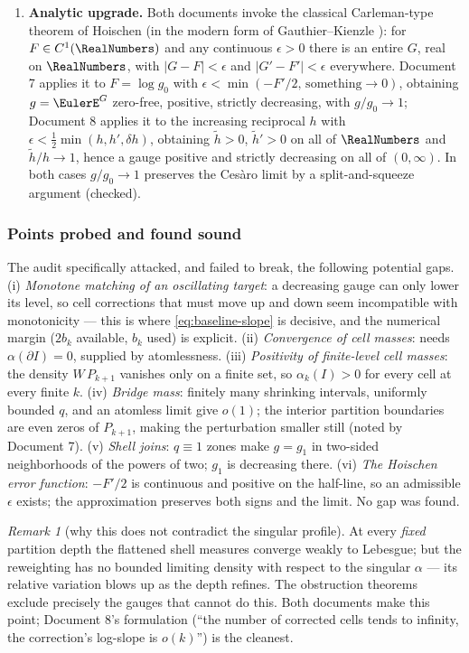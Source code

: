 \documentclass[11pt,oneside]{article}
\theoremstyle{definition}
\theoremstyle{remark}
\newtheorem{remark}[theorem]{Remark}
\begin{document}
\begin{enumerate}
\item \textbf{Analytic upgrade.}  Both documents invoke the classical
Carleman-type theorem of Hoischen (in the modern form of
Gauthier--Kienzle \cite{gauthier-kienzle,hoischen}): for
$F\in C^1(\RealNumbers)$ and any continuous $\epsilon>0$ there is an entire $G$,
real on $\RealNumbers$, with $|G-F|<\epsilon$ and $|G'-F'|<\epsilon$ everywhere.
Document 7 applies it to $F=\log g_0$ with
$\epsilon<\min(-F'/2,\,\text{something}\to0)$, obtaining
$g=\EulerE^G$ zero-free, positive, strictly decreasing, with
$g/g_0\to1$; Document 8 applies it to the increasing reciprocal $h$
with $\epsilon<\frac12\min(h,h',\delta h)$, obtaining
$\widetilde h>0$, $\widetilde h'>0$ on all of $\RealNumbers$ and
$\widetilde h/h\to1$, hence a gauge positive and strictly decreasing on
all of $(0,\infty)$.  In both cases $g/g_0\to1$ preserves the Ces\`aro
limit by a split-and-squeeze argument (checked).
\end{enumerate}

\subsubsection*{Points probed and found sound}

The audit specifically attacked, and failed to break, the following
potential gaps.  (i) \emph{Monotone matching of an oscillating target}:
a decreasing gauge can only lower its level, so cell corrections that
must move up and down seem incompatible with monotonicity --- this is
where \eqref{eq:baseline-slope} is decisive, and the numerical margin
($2b_k$ available, $b_k$ used) is explicit.  (ii) \emph{Convergence of
cell masses}: needs $\alpha(\partial I)=0$, supplied by atomlessness.
(iii) \emph{Positivity of finite-level cell masses}: the density
$W\,P_{k+1}$ vanishes only on a finite set, so
$\alpha_k(I)>0$ for every cell at every finite $k$.  (iv) \emph{Bridge
mass}: finitely many shrinking intervals, uniformly bounded $q$, and an
atomless limit give $o(1)$; the interior partition boundaries are even
zeros of $P_{k+1}$, making the perturbation smaller still (noted by
Document 7).  (v) \emph{Shell joins}: $q\equiv1$ zones make $g=g_1$
in two-sided neighborhoods of the powers of two; $g_1$ is decreasing
there.  (vi) \emph{The Hoischen error function}: $-F'/2$ is continuous
and positive on the half-line, so an admissible $\epsilon$ exists; the
approximation preserves both signs and the limit.  No gap was found.

\begin{remark}[why this does not contradict the singular profile]
At every \emph{fixed} partition depth the flattened shell measures
converge weakly to Lebesgue; but the reweighting has no bounded
limiting density with respect to the singular $\alpha$ --- its relative
variation blows up as the depth refines.  The obstruction theorems
exclude precisely the gauges that cannot do this.  Both documents make
this point; Document 8's formulation (``the number of corrected cells
tends to infinity, the correction's log-slope is $o(k)$'') is the
cleanest.
\end{remark}
\end{document}
